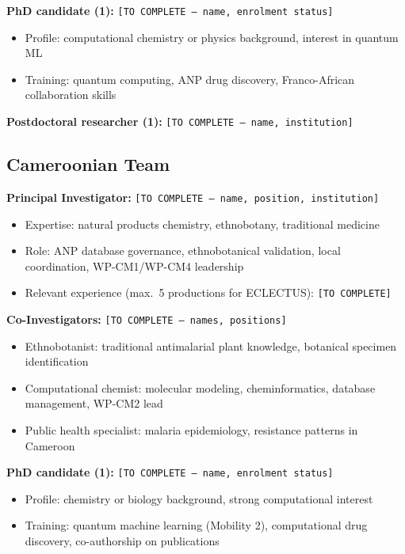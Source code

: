 \documentclass[11pt,a4paper]{article}
\begin{document}
\textbf{PhD candidate (1):} \texttt{[TO COMPLETE --- name, enrolment status]}
\begin{itemize}
    \item Profile: computational chemistry or physics background, interest in quantum ML
    \item Training: quantum computing, ANP drug discovery, Franco-African collaboration skills
\end{itemize}

\textbf{Postdoctoral researcher (1):} \texttt{[TO COMPLETE --- name, institution]}

\subsection{Cameroonian Team}

\textbf{Principal Investigator:} \texttt{[TO COMPLETE --- name, position, institution]}
\begin{itemize}
    \item Expertise: natural products chemistry, ethnobotany, traditional medicine
    \item Role: ANP database governance, ethnobotanical validation, local coordination, WP-CM1/WP-CM4 leadership
    \item Relevant experience (max.\ 5 productions for ECLECTUS): \texttt{[TO COMPLETE]}
\end{itemize}

\textbf{Co-Investigators:} \texttt{[TO COMPLETE --- names, positions]}
\begin{itemize}
    \item Ethnobotanist: traditional antimalarial plant knowledge, botanical specimen identification
    \item Computational chemist: molecular modeling, cheminformatics, database management, WP-CM2 lead
    \item Public health specialist: malaria epidemiology, resistance patterns in Cameroon
\end{itemize}

\textbf{PhD candidate (1):} \texttt{[TO COMPLETE --- name, enrolment status]}
\begin{itemize}
    \item Profile: chemistry or biology background, strong computational interest
    \item Training: quantum machine learning (Mobility 2), computational drug discovery, co-authorship on publications
\end{itemize}
\end{document}
